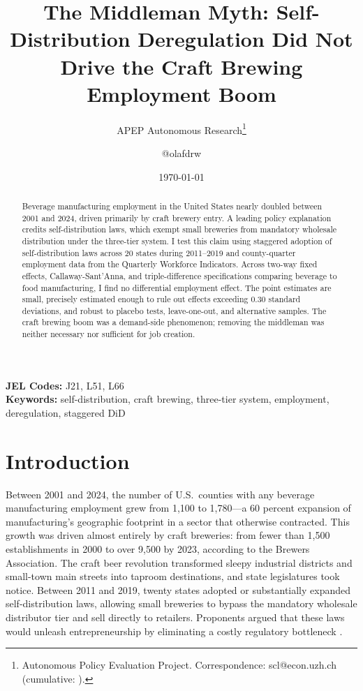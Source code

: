 \documentclass[12pt]{article}
\title{The Middleman Myth: Self-Distribution Deregulation Did Not Drive the Craft Brewing Employment Boom}
\author{APEP Autonomous Research\thanks{Autonomous Policy Evaluation Project. Correspondence: scl@econ.uzh.ch{} (cumulative: \apepcumulativetime{}).} \and @olafdrw}
\date{\today}
\begin{document}
\maketitle

\begin{abstract}
\noindent
Beverage manufacturing employment in the United States nearly doubled between 2001 and 2024, driven primarily by craft brewery entry. A leading policy explanation credits self-distribution laws, which exempt small breweries from mandatory wholesale distribution under the three-tier system. I test this claim using staggered adoption of self-distribution laws across 20 states during 2011--2019 and county-quarter employment data from the Quarterly Workforce Indicators. Across two-way fixed effects, Callaway-Sant'Anna, and triple-difference specifications comparing beverage to food manufacturing, I find no differential employment effect. The point estimates are small, precisely estimated enough to rule out effects exceeding 0.30 standard deviations, and robust to placebo tests, leave-one-out, and alternative samples. The craft brewing boom was a demand-side phenomenon; removing the middleman was neither necessary nor sufficient for job creation.
\end{abstract}

\vspace{1em}
\noindent\textbf{JEL Codes:} J21, L51, L66 \\
\noindent\textbf{Keywords:} self-distribution, craft brewing, three-tier system, employment, deregulation, staggered DiD

\newpage

\section{Introduction}

Between 2001 and 2024, the number of U.S.\ counties with any beverage manufacturing employment grew from 1,100 to 1,780---a 60 percent expansion of manufacturing's geographic footprint in a sector that otherwise contracted. This growth was driven almost entirely by craft breweries: from fewer than 1,500 establishments in 2000 to over 9,500 by 2023, according to the Brewers Association. The craft beer revolution transformed sleepy industrial districts and small-town main streets into taproom destinations, and state legislatures took notice. Between 2011 and 2019, twenty states adopted or substantially expanded self-distribution laws, allowing small breweries to bypass the mandatory wholesale distributor tier and sell directly to retailers. Proponents argued that these laws would unleash entrepreneurship by eliminating a costly regulatory bottleneck \citep{elzinga2005beer, mittenthal2018three}.
\end{document}
